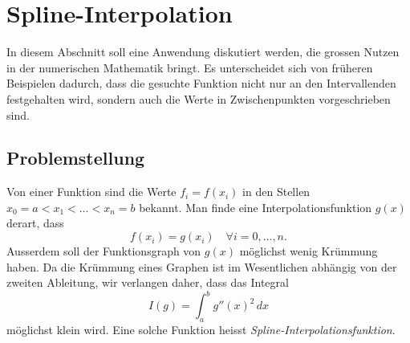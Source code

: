 %
%
%
\section{Spline-Interpolation
\label{buch:variation:section:splines}}
In diesem Abschnitt soll eine Anwendung diskutiert werden, die grossen
Nutzen in der numerischen Mathematik bringt.
Es unterscheidet sich von früheren Beispielen dadurch, dass die
gesuchte Funktion nicht nur an den Intervallenden festgehalten wird,
sondern auch die Werte in Zwischenpunkten vorgeschrieben sind.

%
%
\subsection{Problemstellung}
Von einer Funktion sind die Werte 
$f_i=f(x_i)$ in den Stellen $x_0=a<x_1<\dots<x_n=b$ bekannt.
Man finde eine Interpolationsfunktion $g(x)$ derart, dass
\[
f(x_i) = g(x_i)
\quad
\forall i=0,\dots,n.
\]
Ausserdem soll der Funktionsgraph von $g(x)$ möglichst wenig Krümmung haben.
Da die Krümmung eines Graphen ist im Wesentlichen abhängig von der zweiten
Ableitung, wir verlangen daher, dass das Integral
\begin{equation}
I(g)
=
\int_a^b g''(x)^2\,dx
\label{buch:variation:spline:eqn:funktional}
\end{equation}
möglichst klein wird.
Eine solche Funktion heisst {\em Spline-Interpolationsfunktion}.

%
%
